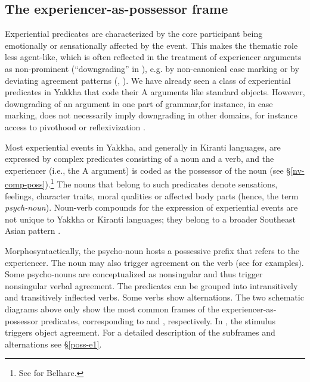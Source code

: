 \subsection{The experiencer-as-possessor frame}\label{exp}



\noindent
Experiential predicates are characterized by the core participant being emotionally or sensationally affected by the event. This makes the thematic role  less agent-like, which is often reflected in the treatment of experiencer arguments as non-prominent (“downgrading” in \citealt{Bickel2004The-syntax}), e.g. by non-canonical case marking or by deviating agreement patterns (\citealt[22]{Levinetal2005_Argument}, \citealt[185]{Naess2007_Prototypical}). We have already seen a class of experiential predicates in Yakkha that code their A arguments like standard objects. However, downgrading of an argument in one part of grammar,for instance, in case marking, does not necessarily imply downgrading in other domains, for instance access to pivothood or reflexivization \citep[77]{Bickel2004The-syntax}.

Most experiential events in Yakkha, and generally in Kiranti languages, are expressed by complex predicates consisting of a noun and a verb, and the 
experiencer (i.e., the A argument) is coded as the possessor of the noun (see §\ref{nv-comp-poss}).\footnote{See \citet{Bickel1997The-possessive} for Belhare.} 
The nouns that belong to such predicates denote sensations,  feelings,  character traits, moral qualities or affected body parts (hence, the term \emph{psych-noun}). 
Noun-verb compounds for the expression of experiential events are not unique to Yakkha or Kiranti languages; they belong to a broader Southeast Asian 
pattern \citep{Matisoff1986Hearts}. 

Morphosyntactically, the psycho-noun hosts a possessive prefix that refers to the experiencer. The noun may also trigger agreement on the verb (see \Next for examples). Some psycho-nouns are conceptualized as nonsingular and thus trigger nonsingular verbal agreement. The predicates can be grouped into intransitively and transitively inflected verbs. Some verbs show alternations. The two schematic diagrams above only show the most common frames  of the experiencer-as-possessor predicates, corresponding to \Next[a] and \Next[b], respectively. In \Next[c], the stimulus triggers object agreement. For a  detailed description of the subframes and alternations see §\ref{poss-e1}.

